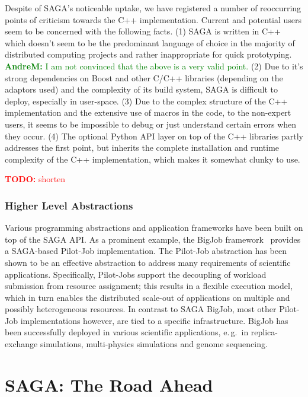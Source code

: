 \documentclass{article}
\newcommand{\B}[1]{\textbf{#1}}
\newcommand{\todo}[1]{{\textcolor{red}{\B{TODO:} #1 }}}
\newcommand{\amnote}[1]{{\textcolor{green}{   \B{AndreM:  } #1 }}}
\newcommand{\amnote}[1]{}
\begin{document}
  Despite of SAGA's noticeable uptake, we have registered a number of
  reoccurring points of criticism towards the C++ implementation.
  Current and potential users seem to be concerned with the following
  facts. 
  (1) SAGA is written in C++ which doesn't seem to be the predominant
  language of choice in the majority of distributed computing projects
  and rather inappropriate for quick prototyping.  \amnote{I am not
  convinced that the above is a very valid point.}
  (2) Due to it's strong dependencies on Boost and other C/C++
  libraries (depending on the adaptors used) and the complexity of its
  build system, SAGA is difficult to deploy, especially in user-space.
  (3) Due to the complex structure of the C++ implementation and the
  extensive use of macros in the code, to the non-expert users, it
  seems to be impossible to debug or just understand certain errors
  when they occur.
  (4) The optional Python API layer on top of the C++ libraries partly
  addresses the first point, but inherits the complete installation
  and runtime complexity of the C++ implementation, which makes it
  somewhat clunky to use.

  \todo{shorten}


 \subsubsection{Higher Level Abstractions}

  Various programming abstractions and application frameworks have
  been built on top of the SAGA API.  As a prominent example, the
  BigJob framework~\cite{saga_bigjob_condor_cloud}  provides
  a SAGA-based Pilot-Job implementation. The Pilot-Job abstraction has
  been shown to be an effective abstraction to address many
  requirements of scientific applications.  Specifically, Pilot-Jobs
  support the decoupling of workload submission from resource
  assignment; this results in a flexible execution model, which in
  turn enables the distributed scale-out of applications on multiple
  and possibly heterogeneous resources. In contrast to SAGA BigJob,
  most other Pilot-Job implementations however, are tied to a specific
  infrastructure. BigJob has been successfully deployed in various
  scientific applications, e.\,g.\ in replica-exchange simulations,
  multi-physics simulations and genome sequencing.


\section{SAGA: The Road Ahead}
\label{sec:road}
\end{document}
